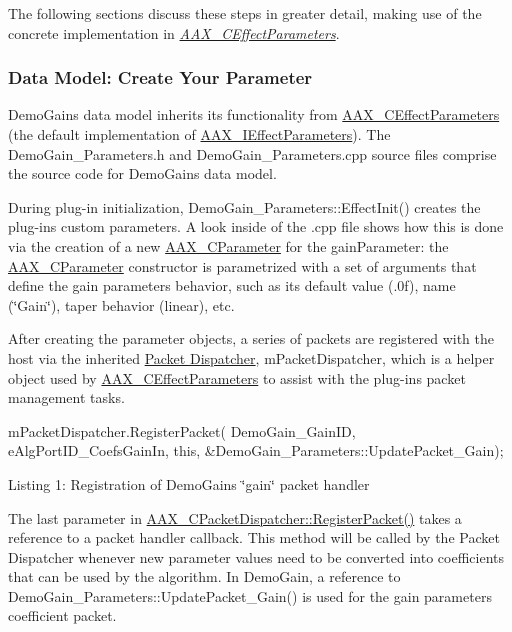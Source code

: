 The following sections discuss these steps in greater detail, making use of the concrete implementation in {\itshape \hyperlink{a00018}{A\+A\+X\+\_\+\+C\+Effect\+Parameters}}.

\hypertarget{a00324_subsection__data_model_create_your_parameter}{}\subsubsection{Data Model\+: Create Your Parameter}\label{a00324_subsection__data_model_create_your_parameter}
Demo\+Gain\textquotesingle{}s data model inherits its functionality from \hyperlink{a00018}{A\+A\+X\+\_\+\+C\+Effect\+Parameters} (the default implementation of \hyperlink{a00099}{A\+A\+X\+\_\+\+I\+Effect\+Parameters}). The {\ttfamily Demo\+Gain\+\_\+\+Parameters.\+h} and {\ttfamily Demo\+Gain\+\_\+\+Parameters.\+cpp} source files comprise the source code for Demo\+Gain\textquotesingle{}s data model.

During plug-\/in initialization, {\ttfamily Demo\+Gain\+\_\+\+Parameters\+::\+Effect\+Init()} creates the plug-\/in\textquotesingle{}s custom parameters. A look inside of the .cpp file shows how this is done via the creation of a new \hyperlink{a00033}{A\+A\+X\+\_\+\+C\+Parameter} for the gain\+Parameter\+: the \hyperlink{a00033}{A\+A\+X\+\_\+\+C\+Parameter} constructor is parametrized with a set of arguments that define the gain parameter\textquotesingle{}s behavior, such as its default value ({.\+0f}), name (\char`\"{}\+Gain\char`\"{}), taper behavior (linear), etc.

After creating the parameter objects, a series of packets are registered with the host via the inherited \hyperlink{a00031}{Packet Dispatcher}, {\ttfamily m\+Packet\+Dispatcher}, which is a helper object used by \hyperlink{a00018}{A\+A\+X\+\_\+\+C\+Effect\+Parameters} to assist with the plug-\/in\textquotesingle{}s packet management tasks.


\begin{DoxyCode}
mPacketDispatcher.RegisterPacket(
    DemoGain\_GainID,
    eAlgPortID\_CoefsGainIn,
    \textcolor{keyword}{this},
    &DemoGain\_Parameters::UpdatePacket\_Gain); 
\end{DoxyCode}
  Listing 1\+: Registration of Demo\+Gain\textquotesingle{}s \char`\"{}gain\char`\"{} packet handler

The last parameter in \hyperlink{a00031_a1848f0bfa473b54e9ee8e32872c89cb1}{A\+A\+X\+\_\+\+C\+Packet\+Dispatcher\+::\+Register\+Packet()} takes a reference to a packet handler callback. This method will be called by the Packet Dispatcher whenever new parameter values need to be converted into coefficients that can be used by the algorithm. In Demo\+Gain, a reference to Demo\+Gain\+\_\+\+Parameters\+::\+Update\+Packet\+\_\+\+Gain() is used for the gain parameter\textquotesingle{}s coefficient packet.


